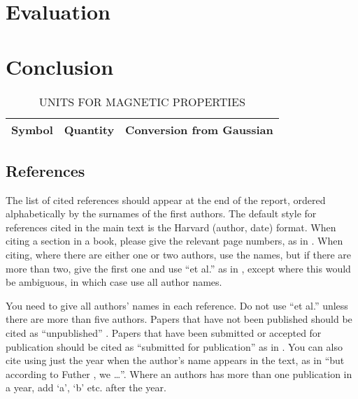 \documentclass[12pt,a4paper]{article}
\begin{document}
\section{Evaluation}
\section{Conclusion}


\begin{table}[htb]
\centering
\caption{UNITS FOR MAGNETIC PROPERTIES}
\vspace*{6pt}
\label{units}
\begin{tabular}{ccc}\hline\hline
Symbol & Quantity & Conversion from Gaussian \\ \hline
\end{tabular}
\end{table}

\subsection{References}

The list of cited references should appear at the end of the report, ordered alphabetically by the surnames of the first authors.  The default style for references cited in the main text is the  Harvard (author, date) format.  When citing a section in a book, please give the relevant page numbers, as in \cite[p293]{budgen}.  When citing, where there are either one or two authors, use the names, but if there are more than two, give the first one and use ``et al.'' as in  , except where this would be ambiguous, in which case use all author names.

You need to give all authors' names in each reference.  Do not use ``et al.'' unless there are more than five authors.  Papers that have not been published should be cited as ``unpublished'' \cite{euther}.  Papers that have been submitted or accepted for publication should be cited as ``submitted for publication'' as in \cite{futher} .  You can also cite using just the year when the author's name appears in the text, as in ``but according to Futher \citeyear{futher}, we \dots''.  Where an authors has more than one publication in a year, add `a', `b' etc. after the year.\cite{rl_survey}





\end{document}
